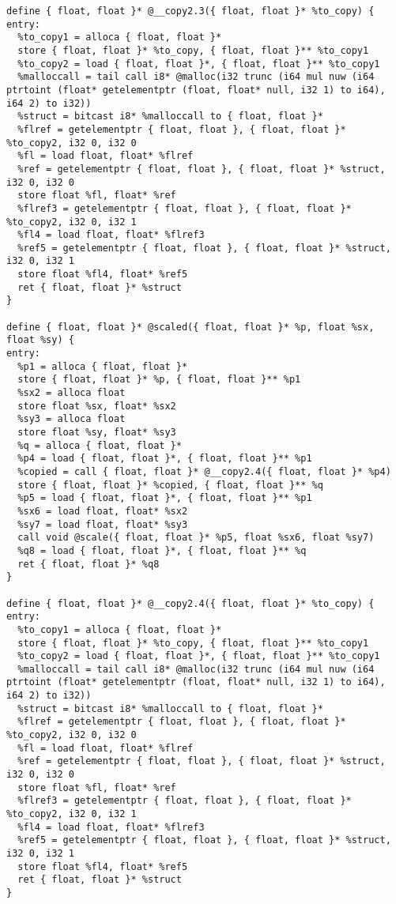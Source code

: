 \documentclass[main.tex]{subfiles}
\begin{document}
{\begin{lstlisting}
define { float, float }* @__copy2.3({ float, float }* %to_copy) {
entry:
  %to_copy1 = alloca { float, float }*
  store { float, float }* %to_copy, { float, float }** %to_copy1
  %to_copy2 = load { float, float }*, { float, float }** %to_copy1
  %malloccall = tail call i8* @malloc(i32 trunc (i64 mul nuw (i64 ptrtoint (float* getelementptr (float, float* null, i32 1) to i64), i64 2) to i32))
  %struct = bitcast i8* %malloccall to { float, float }*
  %flref = getelementptr { float, float }, { float, float }* %to_copy2, i32 0, i32 0
  %fl = load float, float* %flref
  %ref = getelementptr { float, float }, { float, float }* %struct, i32 0, i32 0
  store float %fl, float* %ref
  %flref3 = getelementptr { float, float }, { float, float }* %to_copy2, i32 0, i32 1
  %fl4 = load float, float* %flref3
  %ref5 = getelementptr { float, float }, { float, float }* %struct, i32 0, i32 1
  store float %fl4, float* %ref5
  ret { float, float }* %struct
}

define { float, float }* @scaled({ float, float }* %p, float %sx, float %sy) {
entry:
  %p1 = alloca { float, float }*
  store { float, float }* %p, { float, float }** %p1
  %sx2 = alloca float
  store float %sx, float* %sx2
  %sy3 = alloca float
  store float %sy, float* %sy3
  %q = alloca { float, float }*
  %p4 = load { float, float }*, { float, float }** %p1
  %copied = call { float, float }* @__copy2.4({ float, float }* %p4)
  store { float, float }* %copied, { float, float }** %q
  %p5 = load { float, float }*, { float, float }** %p1
  %sx6 = load float, float* %sx2
  %sy7 = load float, float* %sy3
  call void @scale({ float, float }* %p5, float %sx6, float %sy7)
  %q8 = load { float, float }*, { float, float }** %q
  ret { float, float }* %q8
}

define { float, float }* @__copy2.4({ float, float }* %to_copy) {
entry:
  %to_copy1 = alloca { float, float }*
  store { float, float }* %to_copy, { float, float }** %to_copy1
  %to_copy2 = load { float, float }*, { float, float }** %to_copy1
  %malloccall = tail call i8* @malloc(i32 trunc (i64 mul nuw (i64 ptrtoint (float* getelementptr (float, float* null, i32 1) to i64), i64 2) to i32))
  %struct = bitcast i8* %malloccall to { float, float }*
  %flref = getelementptr { float, float }, { float, float }* %to_copy2, i32 0, i32 0
  %fl = load float, float* %flref
  %ref = getelementptr { float, float }, { float, float }* %struct, i32 0, i32 0
  store float %fl, float* %ref
  %flref3 = getelementptr { float, float }, { float, float }* %to_copy2, i32 0, i32 1
  %fl4 = load float, float* %flref3
  %ref5 = getelementptr { float, float }, { float, float }* %struct, i32 0, i32 1
  store float %fl4, float* %ref5
  ret { float, float }* %struct
}


\end{lstlisting}}
\end{document}
